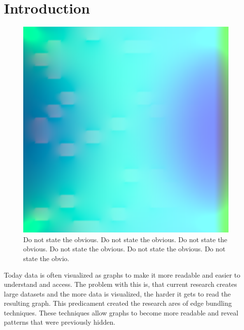 
\chapter{Introduction}

\begin{figure}[t]
  \centering
  \includegraphics[width=0.5\linewidth]{figures/dummy}
  \caption{Do not state the obvious. Do not state the obvious. Do not state the obvious. Do not state the obvious. Do not state the obvious. Do not state the obvio.}
\end{figure}

Today data is often visualized as graphs to make it more readable and easier to understand and access. The problem with this is, that current research creates large datasets and the more data is visualized, the harder it gets to read the resulting graph. This predicament created the research ares of edge bundling techniques. These techniques allow graphs to become more readable and reveal patterns that were previously hidden.

